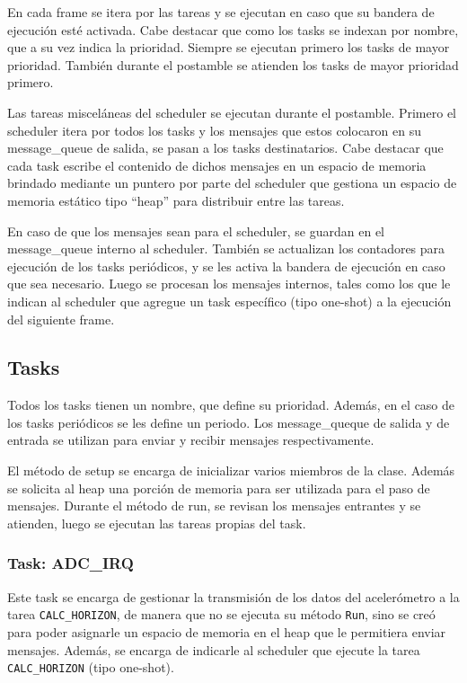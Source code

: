 En cada frame se itera por las tareas y se ejecutan en caso que su bandera de
ejecución esté activada. Cabe destacar que como los tasks se indexan por nombre,
que a su vez indica la prioridad. Siempre se ejecutan primero los tasks de mayor
prioridad. También durante el postamble se atienden los tasks de mayor prioridad
primero.

Las tareas misceláneas del scheduler se ejecutan durante el postamble. Primero
el scheduler itera por todos los tasks y los mensajes que estos colocaron en su
message\_queue de salida, se pasan a los tasks destinatarios. Cabe destacar que
cada task escribe el contenido de dichos mensajes en un espacio de memoria
brindado mediante un puntero por parte del scheduler que gestiona un espacio de
memoria estático tipo ``heap'' para distribuir entre las tareas.

En caso de que los mensajes sean para el scheduler, se guardan en el
message\_queue interno al scheduler. También se actualizan los contadores para
ejecución de los tasks periódicos, y se les activa la bandera de ejecución en
caso que sea necesario. Luego se procesan los mensajes internos, tales como los
que le indican al scheduler que agregue un task específico (tipo one-shot) a la
ejecución del siguiente frame.


\subsection{Tasks}
\label{sec:tasks}

Todos los tasks tienen un nombre, que define su prioridad. Además, en el caso de
los tasks periódicos se les define un periodo. Los message\_queque de salida y
de entrada se utilizan para enviar y recibir mensajes respectivamente.

El método de setup se encarga de inicializar varios miembros de la clase. Además
se solicita al heap una porción de memoria para ser utilizada para el paso de
mensajes. Durante el método de run, se revisan los mensajes entrantes y se
atienden, luego se ejecutan las tareas propias del task.

\subsubsection{Task: ADC\_IRQ}
\label{sec:adc_irq}

Este task se encarga de gestionar la transmisión de los datos del acelerómetro a
la tarea \texttt{CALC\_HORIZON}, de manera que no se ejecuta su método
\texttt{Run}, sino se creó para poder asignarle un espacio de memoria en el heap
que le permitiera enviar mensajes. Además, se encarga de indicarle al scheduler
que ejecute la tarea \texttt{CALC\_HORIZON} (tipo one-shot).

